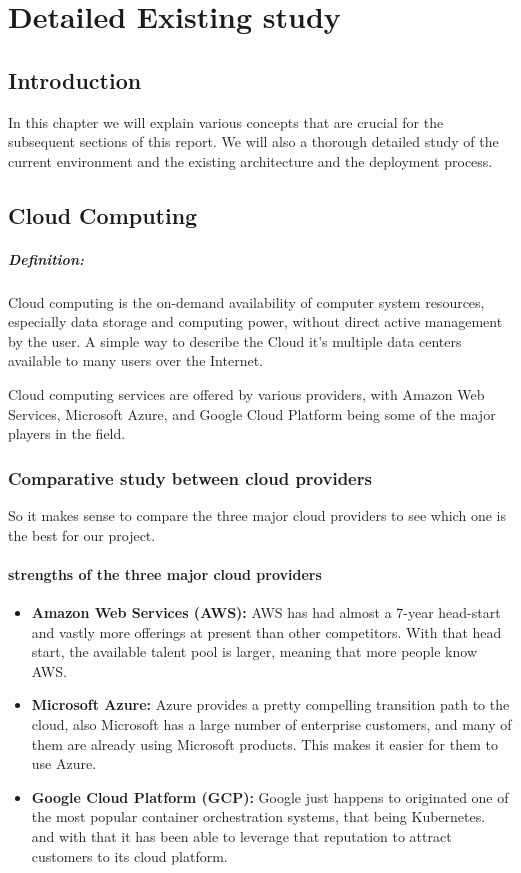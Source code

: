 \chapter{Detailed Existing study}

\section*{Introduction}
In this chapter we will explain various concepts that are crucial for the subsequent sections of this report. We will also a thorough detailed study of the current environment and the existing architecture and the deployment process.

\section{Cloud Computing}
\paragraph*{Definition:}
Cloud computing is the on-demand availability of computer system resources, especially data storage and computing power, without direct active management by the user. A simple way to describe the Cloud it's multiple data centers available to many users over the Internet.
\par
\noindent
Cloud computing services are offered by various providers, with Amazon Web Services, Microsoft Azure, and Google Cloud Platform being some of the major players in the field.
\subsection*{Comparative study between cloud providers}
So it makes sense to compare the three major cloud providers to see which one is the best for our project.
\subsubsection*{strengths of the three major cloud providers \cite{webArticle1}}
\begin{itemize}
    \item \textbf{Amazon Web Services (AWS):} AWS has had almost a 7-year head-start and vastly more offerings at present than other competitors. With that head start, the available talent pool is larger, meaning that more people know AWS.
    \item \textbf{Microsoft Azure:} Azure provides a pretty compelling transition path to the cloud, also Microsoft has a large number of enterprise customers, and many of them are already using Microsoft products. This makes it easier for them to use Azure.
    \item \textbf{Google Cloud Platform (GCP):} Google just happens to originated one of the most popular container orchestration systems, that being Kubernetes. and with that it has been able to leverage that reputation to attract customers to its cloud platform.
\end{itemize}
